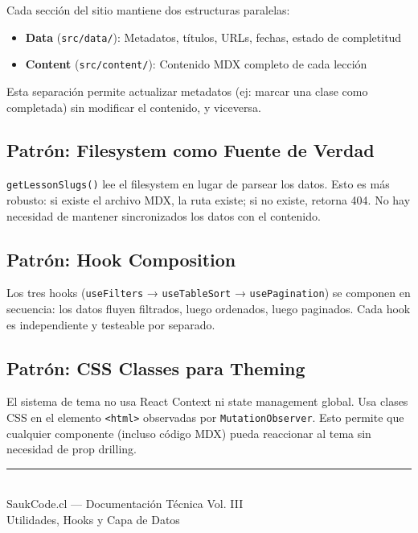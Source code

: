 \documentclass[12pt,a4paper]{article}
\begin{document}
Cada sección del sitio mantiene dos estructuras paralelas:
\begin{itemize}
  \item \textbf{Data} (\texttt{src/data/}): Metadatos, títulos, URLs, fechas, estado de completitud
  \item \textbf{Content} (\texttt{src/content/}): Contenido MDX completo de cada lección
\end{itemize}

Esta separación permite actualizar metadatos (ej: marcar una clase como completada) sin modificar el contenido, y viceversa.

\subsection{Patrón: Filesystem como Fuente de Verdad}

\texttt{getLessonSlugs()} lee el filesystem en lugar de parsear los datos. Esto es más robusto: si existe el archivo MDX, la ruta existe; si no existe, retorna 404. No hay necesidad de mantener sincronizados los datos con el contenido.

\subsection{Patrón: Hook Composition}

Los tres hooks (\texttt{useFilters} → \texttt{useTableSort} → \texttt{usePagination}) se componen en secuencia: los datos fluyen filtrados, luego ordenados, luego paginados. Cada hook es independiente y testeable por separado.

\subsection{Patrón: CSS Classes para Theming}

El sistema de tema no usa React Context ni state management global. Usa clases CSS en el elemento \texttt{<html>} observadas por \texttt{MutationObserver}. Esto permite que cualquier componente (incluso código MDX) pueda reaccionar al tema sin necesidad de prop drilling.

\vspace{1cm}
\begin{center}
\rule{8cm}{0.4pt}\\[0.3cm]
{\small\color{codegray} SaukCode.cl --- Documentación Técnica Vol. III\\
Utilidades, Hooks y Capa de Datos}
\end{center}
\end{document}
